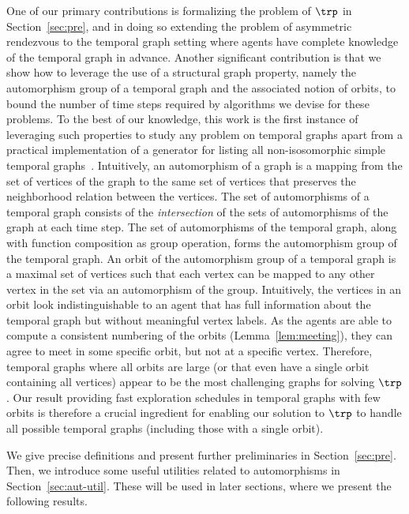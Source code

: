 One of our primary contributions is formalizing the problem of $\trp$ in
Section~\ref{sec:pre}, and in doing so extending the problem of asymmetric
rendezvous to the temporal graph setting where agents have complete knowledge of
the temporal graph in advance. {Another significant contribution is that we
show} how to leverage the use of a structural graph property, namely the
automorphism group of a temporal
graph and the associated notion of orbits, to bound the number of time steps
required by algorithms we devise for these problems. To the best of our
knowledge, this work is the first instance of leveraging such properties to
study any problem on temporal graphs apart from a practical
implementation of a generator for listing all non-isosomorphic simple temporal
graphs~\cite{Casteigts20}. Intuitively, an automorphism of a graph is a mapping
from the set of vertices of the graph to the same set of vertices that preserves
the
neighborhood relation between the vertices. The set of automorphisms of a temporal graph
consists of the \textit{intersection} of the sets of automorphisms of the
graph at each time step. The set of automorphisms of the temporal graph,
along with function composition as group operation, forms the automorphism group of the
temporal graph. An orbit of the automorphism group of a temporal graph is a maximal set
of vertices such that each vertex can be mapped to any other vertex in the set via
an automorphism of the group.
Intuitively, the vertices in an orbit look indistinguishable
to an agent that has full information about the temporal graph but
without meaningful vertex labels. As the agents are able to compute a
consistent numbering of the orbits (Lemma~\ref{lem:meeting}), they can agree to meet
in some specific orbit, but not at a specific vertex.
{Therefore, temporal graphs where all orbits are large
(or that even have a single orbit containing all vertices)
appear to be the most challenging graphs for solving
$\trp$. Our result providing fast exploration schedules
in temporal graphs with few orbits is therefore a
crucial ingredient for enabling our solution to $\trp$ to handle
all possible temporal graphs (including those with a single
orbit).}


%
%
%

We give precise definitions and present further preliminaries in
Section~\ref{sec:pre}. Then,
we introduce some useful
utilities related to automorphisms in Section~\ref{sec:aut-util}. These
will be used in later sections, where we present the following
results. 

